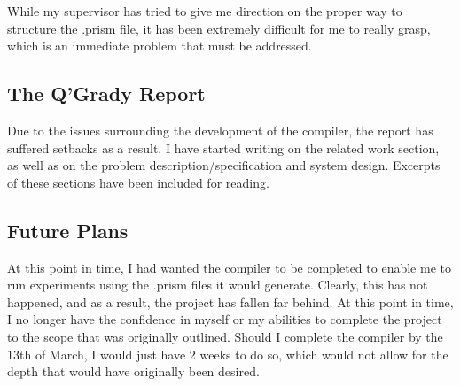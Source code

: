 \documentclass[report.tex]{subfiles}
\begin{document}
While my supervisor has tried to give me direction on the proper way to
structure the .prism file, it has been extremely difficult for me to really
grasp, which is an immediate problem that must be addressed.

\subsection{The Q'Grady Report} %
\label{sub:the_q_grady_report}
Due to the issues surrounding the development of the compiler, the report has
suffered setbacks as a result. I have started writing on the related work
section, as well as on the problem description/specification and system design.
Excerpts of these sections have been included for reading.

\subsection{Future Plans} %
\label{sub:future_plans}
At this point in time, I had wanted the compiler to be completed to enable me to
run experiments using the .prism files it would generate. Clearly, this has not
happened, and as a result, the project has fallen far behind. At this point in
time, I no longer have the confidence in myself or my abilities to complete the
project to the scope that was originally outlined. Should I complete the
compiler by the 13th of March, I would just have 2 weeks to do so, which would
not allow for the depth that would have originally been desired.

\newpage
\end{document}
